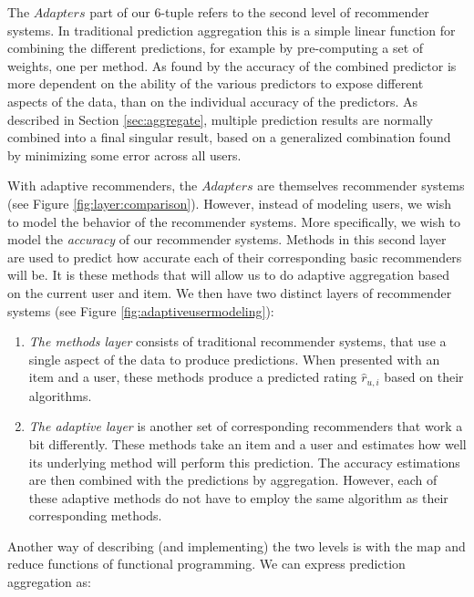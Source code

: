 The $Adapters$ part of our 6-tuple refers to the second level of recommender systems.
In traditional prediction aggregation this is a simple linear function for combining the different predictions,
for example by pre-computing a set of weights, one per method.
As found by \citet[p6]{Bell2007} the accuracy of the combined predictor is more dependent on the 
ability of the various predictors to expose different aspects of the data, than on 
the individual accuracy of the predictors.
As described in Section \ref{sec:aggregate}, multiple prediction results are normally 
combined into a final singular result,
based on a generalized combination found by minimizing some error across all users.

With adaptive recommenders, the $Adapters$ are themselves recommender systems 
(see Figure \ref{fig:layer:comparison}).
However, instead of modeling users, we wish to model the behavior of the recommender systems.
More specifically, we wish to model the \emph{accuracy} of our recommender systems.
Methods in this second layer are used to predict how accurate each of their corresponding basic recommenders will be.
It is these methods that will allow us to do adaptive aggregation based on the current user and item.
We then have two distinct layers of recommender systems 
(see Figure \ref{fig:adaptiveusermodeling}):



\begin{enumerate}
  \item
    \emph{The methods layer} consists of traditional recommender systems, that use a single aspect of the data to produce predictions.
    When presented with an item and a user, these methods produce a predicted rating $\hat{r}_{u,i}$ based on their algorithms.
  \item
    \emph{The adaptive layer} is another set of corresponding recommenders that work a bit differently.
    These methods take an item and a user and estimates how well its underlying method will perform this prediction.
    The accuracy estimations are then combined with the predictions by aggregation.
    However, each of these adaptive methods do not have to employ the same algorithm as their corresponding methods.
\end{enumerate}

Another way of describing (and implementing) the two levels is with
the $\mathrm{map}$ and $\mathrm{reduce}$ functions of functional programming.
We can express prediction aggregation as:

